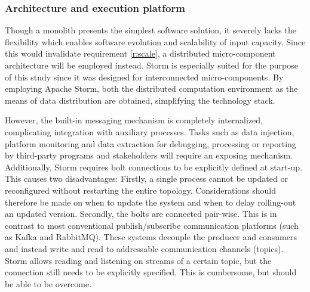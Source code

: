 \subsubsection{Architecture and execution platform}
Though a monolith presents the simplest software solution, it severely lacks the flexibility which enables software evolution and scalability of input capacity. Since this would invalidate requirement \ref{r:scale}, a distributed micro-component architecture will be employed instead. Storm is especially suited for the purpose of this study since it was designed for interconnected micro-components. By employing Apache Storm, both the distributed computation environment as the means of data distribution are obtained, simplifying the technology stack.

However, the built-in messaging mechanism is completely internalized, complicating integration with auxiliary processes. Tasks such as data injection, platform monitoring and data extraction for debugging, processing or reporting by third-party programs and stakeholders will require an exposing mechanism. Additionally, Storm requires bolt connections to be explicitly defined at start-up. This causes two disadvantages: Firstly, a single process cannot be updated or reconfigured without restarting the entire topology. Considerations should therefore be made on when to update the system and when to delay rolling-out an updated version. Secondly, the bolts are connected pair-wise. This is in contrast to most conventional publish/subscribe communication platforms (such as Kafka and RabbitMQ). These systems decouple the producer and consumers and instead write and read to addressable communication channels (topics). Storm allows reading and listening on streams of a certain topic, but the connection still needs to be explicitly specified. This is cumbersome, but should be able to be overcome.



